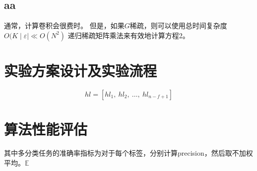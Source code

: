 \subsection{aa}
通常，计算卷积会很费时。 但是，如果$G$稀疏，则可以使用总时间复杂度 $O(K \mid \varepsilon \mid \ll O(N^ 2)$ 递归稀疏矩阵乘法来有效地计算方程2。


\section{实验方案设计及实验流程}
\begin{equation*} hl=[hl_{1},\ hl_{2},\ \ldots,\ hl_{n-f+1}] \tag{-} \end{equation*}

\section{算法性能评估}

其中多分类任务的准确率指标为对于每个标签，分别计算precision，然后取不加权平均。$\mathbb{E}$

